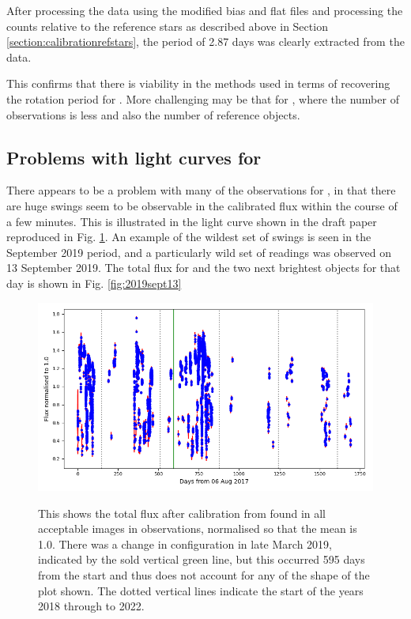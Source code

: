 After processing the data using the modified bias and flat files and processing
the counts relative to the reference stars as described above in Section
\ref{section:calibrationrefstars}, the period of 2.87 days was clearly extracted
from the data.

This confirms that there is viability in the methods used in terms of recovering
the rotation period for \ross. More challenging may be that for \bstar, where
the number of observations is less and also the number of reference objects.

\subsection{Problems with light curves for \ross}
\protect\label{secion:rossprobs}

There appears to be a problem with many of the observations for \ross, in that
there are huge swings seem to be observable in the calibrated flux within the course of a
few minutes. This is illustrated in the light curve shown in the draft paper
reproduced in Fig. \ref{fig:rossallcurve}. An example of the wildest set of
swings is seen in the September 2019 period, and a particularly wild set of
readings was observed on 13 September 2019. The total flux for {\ross} and the
two next brightest objects for that day is shown in Fig. \ref{fig:2019sept13}

\begin{figure}[!htbp]
\begin{center}
\includegraphics[scale=0.40]{images/remrossallcurve.png} \\
\vspace{-.5cm}
\end{center}
\caption{This shows the total flux after calibration from {\ross}
found in all acceptable images in {\rem}
observations, normalised so that the mean is 1.0. There was a change in
configuration in late March 2019, indicated by the sold vertical green line, but
this occurred 595 days from the start and thus does
not account for any of the shape of the plot
shown. The dotted vertical lines indicate the
start of the years 2018 through to 2022.}\protect\label{fig:rossallcurve}
\end{figure}

